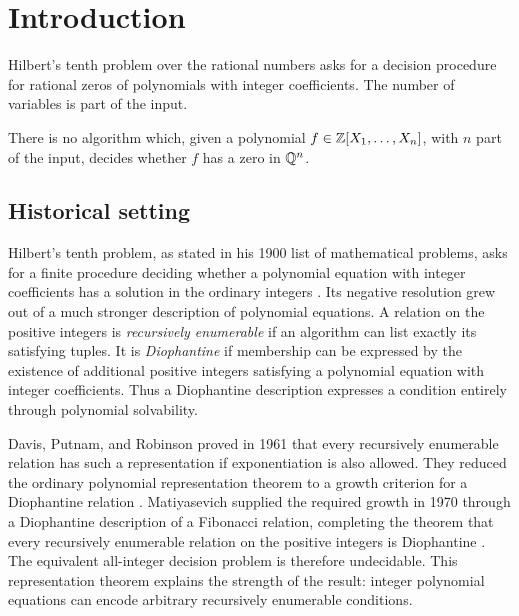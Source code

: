 \section{Introduction}\label{sec:introduction}

Hilbert's tenth problem over the rational numbers asks for a decision
procedure for rational zeros of polynomials with integer coefficients.
The number of variables is part of the input.

\begin{theorem}\label{thm:main}
There is no algorithm which, given a polynomial
$f\in\mathbb Z[X_1,\ldots,X_n]$, with $n$ part of the input, decides whether
$f$ has a zero in $\mathbb Q^n$.
\end{theorem}

\subsection{Historical setting}

Hilbert's tenth problem, as stated in his 1900 list of mathematical
problems, asks for a finite procedure deciding whether a polynomial
equation with integer coefficients has a solution in the ordinary
integers \cite[Problem~10]{Hilbert1900}.  Its negative resolution grew
out of a much stronger description of polynomial equations.  A relation
on the positive integers is \emph{recursively enumerable} if an
algorithm can list exactly its satisfying tuples.  It is
\emph{Diophantine} if membership can be expressed by the existence of
additional positive integers satisfying a polynomial equation with
integer coefficients.  Thus a Diophantine description expresses a
condition entirely through polynomial solvability.

Davis, Putnam, and Robinson proved in 1961 that every recursively
enumerable relation has such a representation if exponentiation is
also allowed.  They reduced the ordinary polynomial representation
theorem to a growth criterion for a Diophantine relation
\cite[Theorem and Corollary~3]{DavisPutnamRobinson1961}.
Matiyasevich supplied the required growth in 1970 through a
Diophantine description of a Fibonacci relation, completing the
theorem that every recursively enumerable relation on the positive
integers is Diophantine \cite{Matiyasevich1970}.  The equivalent
all-integer decision problem is therefore undecidable.  This
representation theorem explains the strength of the result: integer
polynomial equations can encode arbitrary recursively enumerable
conditions.

